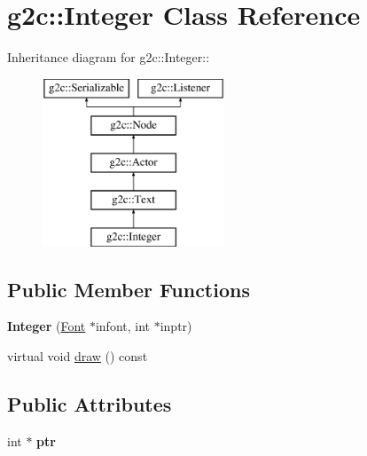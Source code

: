 \hypertarget{classg2c_1_1_integer}{
\section{g2c::Integer Class Reference}
\label{classg2c_1_1_integer}
}
Inheritance diagram for g2c::Integer::\begin{figure}[H]
\begin{center}
\leavevmode
\includegraphics[height=5cm]{classg2c_1_1_integer}
\end{center}
\end{figure}
\subsection*{Public Member Functions}
\begin{DoxyCompactItemize}
\item 
\hypertarget{classg2c_1_1_integer_add9fd9d91de5a9d88f11b5792a46167e}{
{\bfseries Integer} (\hyperlink{classg2c_1_1_font}{Font} $\ast$infont, int $\ast$inptr)}
\label{classg2c_1_1_integer_add9fd9d91de5a9d88f11b5792a46167e}

\item 
virtual void \hyperlink{classg2c_1_1_integer_aac99d7502a55bf5db01f5d673779e36e}{draw} () const 
\end{DoxyCompactItemize}
\subsection*{Public Attributes}
\begin{DoxyCompactItemize}
\item 
\hypertarget{classg2c_1_1_integer_aa7adf2da91c18367bf7da92f7b8a0efb}{
int $\ast$ {\bfseries ptr}}
\label{classg2c_1_1_integer_aa7adf2da91c18367bf7da92f7b8a0efb}

\end{DoxyCompactItemize}



